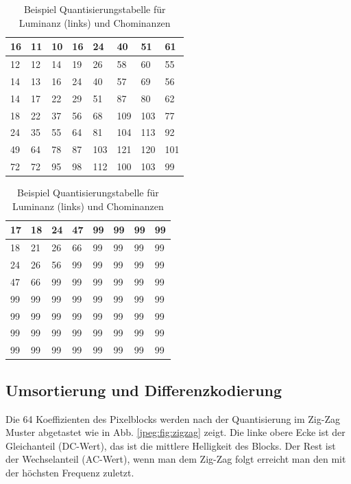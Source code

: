 \begin{table}[b]
    \centering
    \begin{tabularx}{0.47\linewidth}{|X|X|X|X|X|X|X|X|}
        \hline
        16 & 11 & 10 & 16 & 24  & 40 & 51 & 61    \\ \hline
        12 & 12 & 14 & 19 & 26  & 58 & 60 & 55    \\ \hline
        14 & 13 & 16 & 24 & 40  & 57 & 69 & 56    \\ \hline
        14 & 17 & 22 & 29 & 51  & 87 & 80 & 62    \\ \hline
        18 & 22 & 37 & 56 & 68  & 109 & 103 & 77  \\ \hline
        24 & 35 & 55 & 64 & 81  & 104 & 113 & 92  \\ \hline
        49 & 64 & 78 & 87 & 103 & 121 & 120 & 101 \\ \hline
        72 & 72 & 95 & 98 & 112 & 100 & 103 & 99  \\ \hline        
    \end{tabularx}
    \qquad
    \begin{tabularx}{0.47\linewidth}{|X|X|X|X|X|X|X|X|}
        \hline
        17 & 18 & 24 & 47 & 99 & 99 & 99 & 99  \\ \hline
        18 & 21 & 26 & 66 & 99 & 99 & 99 & 99  \\ \hline
        24 & 26 & 56 & 99 & 99 & 99 & 99 & 99  \\ \hline
        47 & 66 & 99 & 99 & 99 & 99 & 99 & 99  \\ \hline
        99 & 99 & 99 & 99 & 99 & 99 & 99 & 99  \\ \hline
        99 & 99 & 99 & 99 & 99 & 99 & 99 & 99  \\ \hline
        99 & 99 & 99 & 99 & 99 & 99 & 99 & 99  \\ \hline
        99 & 99 & 99 & 99 & 99 & 99 & 99 & 99  \\ \hline  	  
    \end{tabularx}
    \caption{Beispiel Quantisierungstabelle für Luminanz (links) und Chominanzen
        \label{jpeg:tab:quant}}
\end{table}



\subsection{Umsortierung und Differenzkodierung
\label{jpeg:subsection:umsortierung}}
Die 64 Koeffizienten des Pixelblocks werden nach der Quantisierung im Zig-Zag Muster abgetastet wie in Abb. \ref{jpeg:fig:zigzag} zeigt.
Die linke obere Ecke ist der Gleichanteil (DC-Wert), das ist die mittlere Helligkeit des Blocks.
Der Rest ist der Wechselanteil (AC-Wert), wenn man dem Zig-Zag folgt erreicht man den mit der höchsten Frequenz zuletzt.

